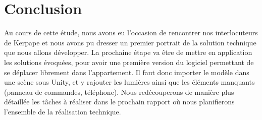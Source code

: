 \documentclass[a4paper,11pt]{article}
\begin{document}
\begin{figure}[h!]
\begin{minipage}{0.3\linewidth}
   \end{minipage}
\end{figure}

\pagebreak

\tableofcontents
\pagebreak


\pagebreak

\pagebreak

\pagebreak

\pagebreak

\pagebreak

\pagebreak

\section{Conclusion}
Au cours de cette étude, nous avons eu l'occasion de rencontrer nos interlocuteurs de Kerpape et nous avons pu dresser un premier portrait de la solution technique que nous allons développer.
La prochaine étape va être de mettre en application les solutions évoquées, pour avoir une première version du logiciel permettant de se déplacer librement dans l'appartement. 
Il faut donc importer le modèle dans une scène sous Unity, et y rajouter les lumières ainsi que les éléments manquants (panneau de commandes, téléphone).
Nous redécouperons de manière plus détaillée les tâches à réaliser dans le prochain rapport où nous planifierons l'ensemble de la réalisation technique.

\pagebreak


\end{document}
